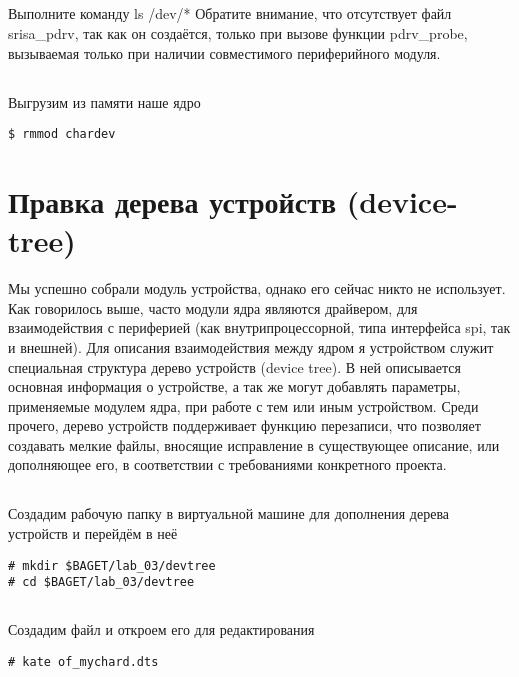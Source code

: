 \subsection{}Выполните команду ls /dev/* Обратите внимание, что отсутствует файл srisa\_pdrv, так как он создаётся, только при вызове функции pdrv\_probe, вызываемая только при наличии совместимого периферийного модуля.

\subsection{}Выгрузим из памяти наше ядро
\begin{lstlisting}[style=bash]
$ rmmod chardev
\end{lstlisting}

\section{Правка дерева устройств (device-tree)}
Мы успешно собрали модуль устройства, однако его сейчас никто не использует. Как говорилось выше, часто модули ядра являются драйвером, для взаимодействия с периферией (как внутрипроцессорной, типа интерфейса spi, так и внешней). Для описания взаимодействия между ядром я устройством служит специальная структура дерево устройств (device tree). В ней описывается основная информация о устройстве, а так же могут добавлять параметры, применяемые модулем ядра, при работе с тем или иным устройством. Среди прочего, дерево устройств поддерживает функцию перезаписи, что позволяет создавать мелкие файлы, вносящие исправление в существующее описание, или дополняющее его, в соответствии с требованиями конкретного проекта.

\subsection{}Создадим рабочую папку в виртуальной машине для дополнения дерева устройств и перейдём в неё
\begin{lstlisting}[style=bash]
# mkdir $BAGET/lab_03/devtree
# cd $BAGET/lab_03/devtree 
\end{lstlisting}

\subsection{}Создадим файл и откроем его для редактирования
\begin{lstlisting}[style=bash]
# kate of_mychard.dts
\end{lstlisting}

